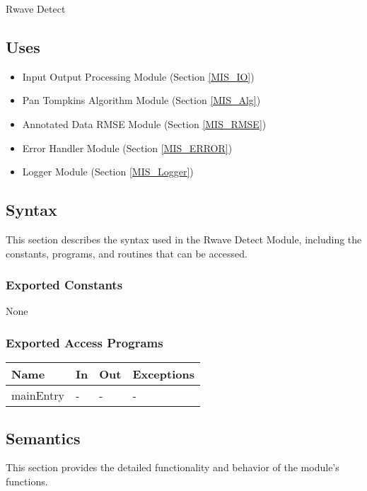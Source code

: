 \documentclass[12pt, titlepage]{article}
\begin{document}
Rwave Detect

\subsection{Uses}

\begin{itemize}
\item Input Output Processing Module (Section \ref{MIS_IO})
\item Pan Tompkins Algorithm Module (Section \ref{MIS_Alg})
\item Annotated Data RMSE Module (Section \ref{MIS_RMSE})
\item Error Handler Module (Section \ref{MIS_ERROR})
\item Logger Module (Section \ref{MIS_Logger})
\end{itemize}

\subsection{Syntax}

This section describes the syntax used in the Rwave Detect Module, including the
constants, programs, and routines that can be accessed.

\subsubsection{Exported Constants}

None

\subsubsection{Exported Access Programs}

\begin{center}
\begin{tabular}{p{2.5cm} p{4.5cm} p{4.5cm} p{3.5cm}}
\hline
\textbf{Name} & \textbf{In} & \textbf{Out} & \textbf{Exceptions} \\
\hline
mainEntry & - & - & - \\
\hline
\end{tabular}
\end{center}

\subsection{Semantics}

This section provides the detailed functionality and behavior of the module’s
functions.
\end{document}
